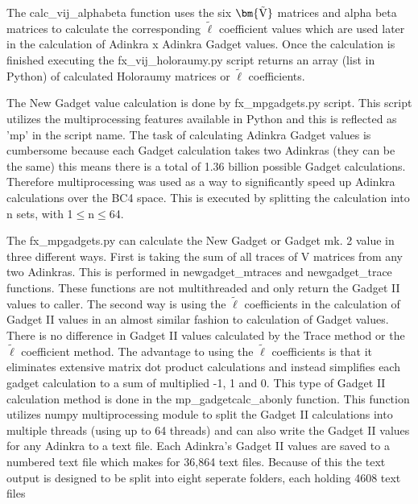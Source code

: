 \documentclass[12pt, letterpaper]{article}
\def\brtV{{\bm{\tilde{\rm V}}}}
\begin{document}
The calc{\_}vij{\_}alphabeta function uses the six $\brtV$ matrices and alpha beta matrices
to calculate the corresponding $\tilde{\ell}$ coefficient values which are used later
in the calculation of Adinkra x Adinkra Gadget values. Once the calculation is finished
executing the fx{\_}vij{\_}holoraumy.py script returns an array (list in Python) of calculated
Holoraumy matrices or $\tilde{\ell}$ coefficients.\par
The New Gadget value calculation is done by fx{\_}mpgadgets.py script. This script utilizes
the multiprocessing features available in Python and this is reflected as 'mp' in the script name.
The task of calculating Adinkra Gadget values is cumbersome because each Gadget calculation
takes two Adinkras (they can be the same) this means there is a total of 1.36 billion possible
Gadget calculations. Therefore multiprocessing was used as a way to significantly speed up
Adinkra calculations over the BC4 space. This is executed by splitting the calculation into n sets,
with 1$\leq$n$\leq$64.\par
The fx{\_}mpgadgets.py can calculate the New Gadget or Gadget mk. 2 value in three different ways.
First is taking the sum of all traces of V matrices from any two Adinkras. This is performed in
newgadget{\_}mtraces and newgadget{\_}trace functions. These functions are not multithreaded and
only return the Gadget II values to caller.
The second way is using the $\tilde{\ell}$ coefficients in the calculation of Gadget II values
in an almost similar fashion to calculation of Gadget values. There is no difference in Gadget II
values calculated by the Trace method or the $\tilde{\ell}$ coefficient method. The advantage to
using the $\tilde{\ell}$ coefficients is that it eliminates extensive matrix dot product calculations
and instead simplifies each gadget calculation to a sum of multiplied -1, 1 and 0. This
type of Gadget II calculation method is done in the mp{\_}gadgetcalc{\_}abonly function. This
function utilizes numpy multiprocessing module to split the Gadget II calculations into multiple threads
(using up to 64 threads) and can also write the Gadget II values for any Adinkra to a text file.
Each Adinkra's Gadget II values are saved to a numbered text file which makes for 36,864 text files.
Because of this the text output is designed to be split into eight seperate folders, each holding 4608 text files
\end{document}
